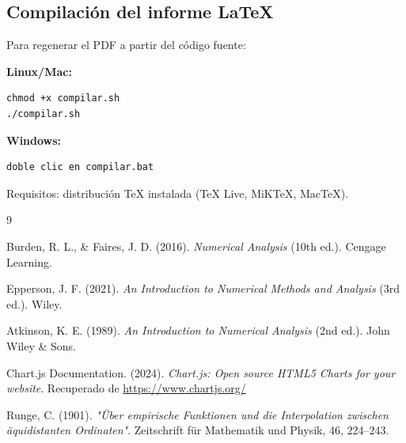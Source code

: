 \documentclass[12pt, letterpaper]{article}
\begin{document}
\subsection{Compilación del informe LaTeX}

Para regenerar el PDF a partir del código fuente:

\textbf{Linux/Mac:}
\begin{lstlisting}[style=pseudocode]
chmod +x compilar.sh
./compilar.sh
\end{lstlisting}

\textbf{Windows:}
\begin{lstlisting}[style=pseudocode]
doble clic en compilar.bat
\end{lstlisting}

Requisitos: distribución TeX instalada (TeX Live, MiKTeX, MacTeX).

\begin{thebibliography}{9}

Burden, R. L., \& Faires, J. D. (2016).
\textit{Numerical Analysis} (10th ed.).
Cengage Learning.

Epperson, J. F. (2021).
\textit{An Introduction to Numerical Methods and Analysis} (3rd ed.).
Wiley.

Atkinson, K. E. (1989).
\textit{An Introduction to Numerical Analysis} (2nd ed.).
John Wiley \& Sons.

Chart.js Documentation. (2024).
\textit{Chart.js: Open source HTML5 Charts for your website}.
Recuperado de \url{https://www.chartjs.org/}

Runge, C. (1901).
\textit{"Über empirische Funktionen und die Interpolation zwischen äquidistanten Ordinaten"}.
Zeitschrift für Mathematik und Physik, 46, 224--243.

\end{thebibliography}
\end{document}
